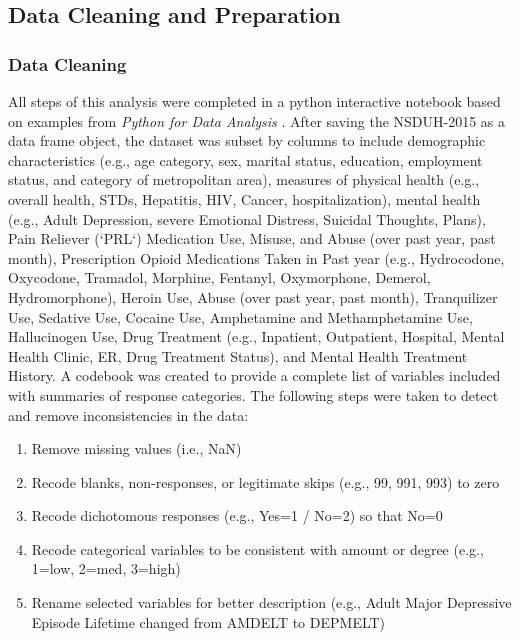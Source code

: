 \documentclass[sigconf]{acmart}
\begin{document}
\subsection{Data Cleaning and Preparation }

\subsubsection{Data Cleaning}
All steps of this analysis were completed in a python interactive notebook 
based on examples from \emph{Python for Data Analysis} \cite{mckinney17}. 
After saving the NSDUH-2015 as a data frame object, the dataset was subset 
by columns to include demographic characteristics (e.g., age category, sex, 
marital status, education, employment status, and category of metropolitan 
area), measures of physical health (e.g., overall health, STDs, Hepatitis, 
HIV, Cancer, hospitalization), mental health (e.g., Adult Depression, severe
Emotional Distress, Suicidal Thoughts, Plans), Pain Reliever (`PRL`) 
Medication Use, Misuse, and Abuse (over past year, past month), Prescription 
Opioid Medications Taken in Past year (e.g., Hydrocodone, Oxycodone, Tramadol, 
Morphine, Fentanyl, Oxymorphone, Demerol, Hydromorphone), Heroin Use, Abuse 
(over past year, past month), Tranquilizer Use, Sedative Use, Cocaine Use, 
Amphetamine and Methamphetamine Use, Hallucinogen Use, Drug Treatment (e.g., 
Inpatient, Outpatient, Hospital, Mental Health Clinic, ER, Drug Treatment 
Status), and Mental Health Treatment History. A codebook was created to 
provide a complete list of variables included with summaries of response 
categories. The following steps were taken to detect and remove 
inconsistencies in the data:
\begin{enumerate}
  \item Remove missing values (i.e., NaN) 
  \item Recode blanks, non-responses, or legitimate skips (e.g., 99, 991, 
  993) to zero  
  \item Recode dichotomous responses (e.g., Yes=1 / No=2) so that No=0
  \item Recode categorical variables to be consistent with amount or degree 
  (e.g., 1=low, 2=med, 3=high)
   \item Rename selected variables for better description (e.g., 
   Adult Major Depressive Episode Lifetime changed from AMDELT to DEPMELT)
\end{enumerate}
\end{document}
